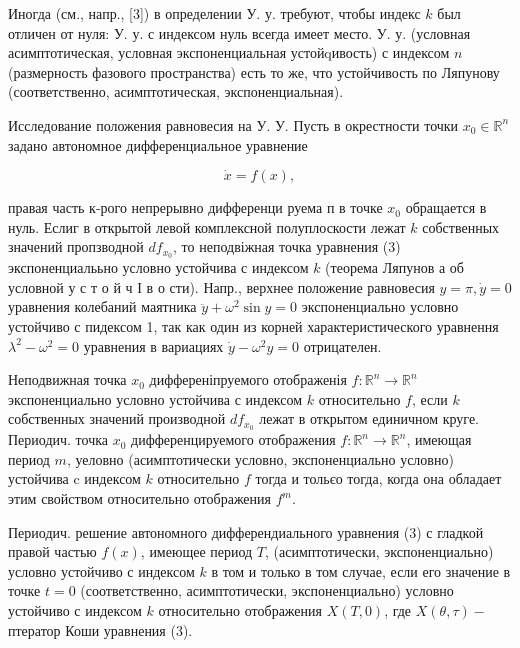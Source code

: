 \documentclass[10pt]{article}
\begin{document}
Иногда (см., напр., [3]) в определении У. у. требуют, чтобы индекс $k$ был отличен от нуля: У. у. с индексом нуль всегда имеет место. У. у. (условная асимптотическая, условная экспоненциальная устойqивость) с индексом $n$ (размерность фазового пространства) есть то же, что устойчивость по Ляпунову (соответственно, асимптотическая, экспоненциальная).



Исследование положения равновесия на У. У. Пусть в окрестности точки $x_{0} \in \mathbb{R}^{n}$ задано автономное дифференциальное уравнение



\[

\dot{x}=f(x),

\]



правая часть к-рого непрерывно дифференци руема п в точке $x_{0}$ обращается в нуль. Еслиг в открытой левой комплексной полуплоскости лежат $k$ собственных значений пропзводной $d f_{x_{0}}$, то неподвіжная точка уравнения (3) экспоненциалььно условно устойчива с индексом $k$ (теорема Ляпунов а об условной у с т о й ч І в о сти). Напр., верхнее положение равновесия $y=\pi, \dot{y}=0$ уравнения колебаний маятника $\ddot{y}+\omega^{2} \sin y=0$ экспоненциально условно устойчиво с пидексом 1, так как один из корней характеристического уравнення $\lambda^{2}-\omega^{2}=0$ уравнения в вариациях $\dot{y}-\omega^{2} y=0$ отрицателен.



Неподвижная точка $x_{0}$ дифференіпруемого отображенія $f: \mathbb{R}^{n} \longrightarrow \mathbb{R}^{n}$ экспоненциально условно устойчива с индексом $k$ относительно $f$, если $k$ собственных значений производной $d f_{x_{0}}$ лежат в открытом единичном круге. Периодич. точка $x_{0}$ дифференцируемого отображения $f: \mathbb{R}^{n} \longrightarrow \mathbb{R}^{n}$, имеющая период $m$, уеловно (асимптотически условно, экспоненциально условно) устойчива c индексом $k$ относительно $f$ тогда и тольєо тогда, когда она обладает этим свойством относительно отображения $f^{m}$.



Периодич. решение автономного дифферендиального уравнения (3) с гладкой правой частью $f(x)$, имеющее период $T$, (асимптотически, экспоненциально) условно устойчиво с индексом $k$ в том и только в том случае, если его значение в точке $t=0$ (соответственно, асимптотически, экспоненциально) условно устойчиво с индексом $k$ относительно отображения $X(T, 0)$, где $X(\theta, \tau)-$ птератор Коши уравнения (3).
\end{document}
